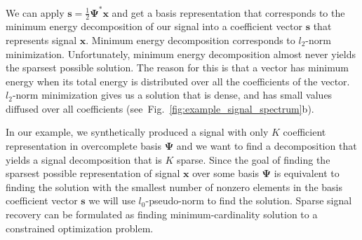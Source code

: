 \documentclass[journal]{IEEEtran}
\begin{document}


We can apply $\boldsymbol{s}=\frac{1}{2}\boldsymbol{\Psi^*}\boldsymbol{x}$ and get a basis representation that corresponds to the minimum energy decomposition of our signal into a coefficient vector $\boldsymbol{s}$ that represents signal $\boldsymbol{x}$. Minimum energy decomposition corresponds to $l_2$-norm minimization. Unfortunately, minimum energy decomposition almost never yields the sparsest possible solution. The reason for this is that a vector has minimum energy when its total energy is distributed over all the coefficients of the vector. $l_2$-norm minimization gives us a solution that is dense, and has small values diffused over all coefficients (see~Fig.~\ref{fig:example_signal_spectrum}b).

In our example, we synthetically produced a signal with only $K$ coefficient representation in overcomplete basis $\boldsymbol{\Psi}$ and we want to find a decomposition that yields a signal decomposition that is $K$ sparse. Since the goal of finding the sparsest possible representation of signal $\boldsymbol{x}$ over some basis $\boldsymbol{\Psi}$ is equivalent to finding the solution with the smallest number of nonzero elements in the basis coefficient vector $\boldsymbol{s}$ we will use $l_0$-pseudo-norm to find the solution. Sparse signal recovery can be formulated as finding minimum-cardinality solution to a constrained optimization problem. 


\end{document}
